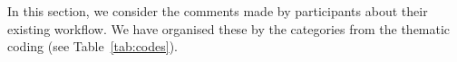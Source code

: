 

In this section, we consider the comments made by participants about their existing workflow. We have organised these
by the categories from the thematic coding (see Table~\ref{tab:codes}).







